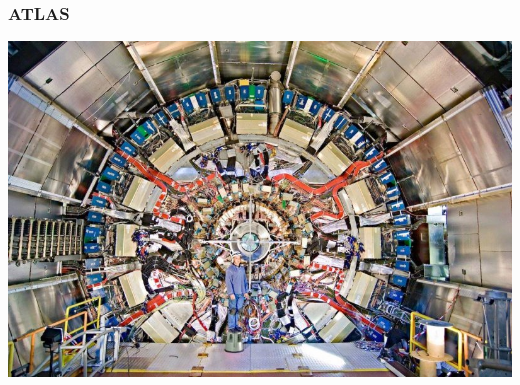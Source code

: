 \documentclass[compress]{beamer}
\begin{document}
\begin{frame}
\frametitle{ATLAS}
\includegraphics[width=\linewidth]{atlas3.jpg}
\end{frame}
\end{document}
